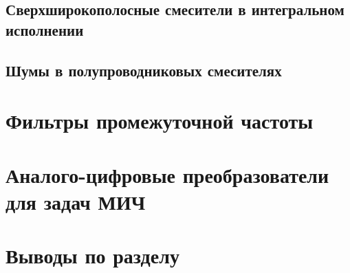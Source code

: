 \subsection{Сверхширокополосные смесители в интегральном исполнении}

\subsection{Шумы в полупроводниковых смесителях}

\section{Фильтры промежуточной частоты}

\section{Аналого-цифровые преобразователи для задач МИЧ}

\section{Выводы по разделу}